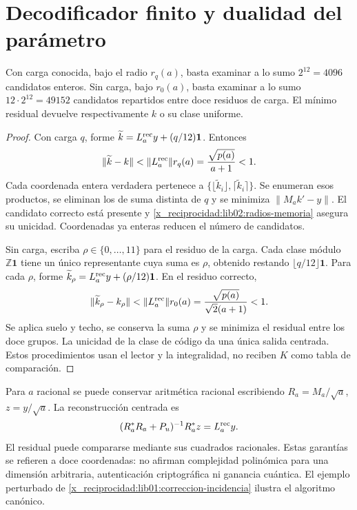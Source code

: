 \section{Decodificador finito y dualidad del parámetro}
\label{x_reciprocidad:lib02:computacion}

\begin{proposition}
\label{x_reciprocidad:lib02:decodificador}
Con carga conocida, bajo el radio \(r_q(a)\), basta examinar a lo
sumo \(2^{12}=4096\) candidatos enteros. Sin carga, bajo
\(r_0(a)\), basta examinar a lo sumo \(12\cdot2^{12}=49152\)
candidatos repartidos entre doce residuos de carga. El mínimo residual
devuelve respectivamente \(k\) o su clase uniforme.
\end{proposition}
\begin{proof}
Con carga \(q\), forme
\(\widetilde k=L_a^{\rm rec}y+(q/12)\mathbf1\). Entonces
\[
 \|\widetilde k-k\|
 <\|L_a^{\rm rec}\|r_q(a)
 =\frac{\sqrt{p(a)}}{a+1}<1.
\]
Cada coordenada entera verdadera pertenece a
\(\{\lfloor\widetilde k_i\rfloor,
\lceil\widetilde k_i\rceil\}\). Se enumeran esos productos,
se eliminan los de suma distinta de \(q\) y se minimiza
\(\|M_ak'-y\|\). El candidato correcto está presente y
\cref{x_reciprocidad:lib02:radios-memoria} asegura su unicidad. Coordenadas ya enteras
reducen el número de candidatos.

Sin carga, escriba \(\rho\in\{0,\ldots,11\}\) para el residuo
de la carga. Cada clase módulo \(\mathbb Z\mathbf1\) tiene un
único representante cuya suma es \(\rho\), obtenido restando
\(\lfloor q/12\rfloor\mathbf1\). Para cada \(\rho\), forme
\(\widetilde k_\rho=L_a^{\rm rec}y+(\rho/12)\mathbf1\).
En el residuo correcto,
\[
 \|\widetilde k_\rho-k_\rho\|
 <\|L_a^{\rm rec}\|r_0(a)
 =\frac{\sqrt{p(a)}}{\sqrt2(a+1)}<1.
\]
Se aplica suelo y techo, se conserva la suma \(\rho\) y se minimiza
el residual entre los doce grupos. La unicidad de la clase de código
da una única salida centrada. Estos procedimientos usan el lector y la
integralidad, no reciben \(K\) como tabla de comparación.
\end{proof}

Para \(a\) racional se puede conservar aritmética racional escribiendo
\(R_a=M_a/\sqrt a\), \(z=y/\sqrt a\). La reconstrucción centrada
es
\[
 (R_a^*R_a+P_u)^{-1}R_a^*z=L_a^{\rm rec}y.
\]
El residual puede compararse mediante sus cuadrados racionales. Estas
garantías se refieren a doce coordenadas: no afirman complejidad
polinómica para una dimensión arbitraria, autenticación criptográfica ni
ganancia cuántica. El ejemplo perturbado de
\cref{x_reciprocidad:lib01:correccion-incidencia} ilustra el algoritmo canónico.


